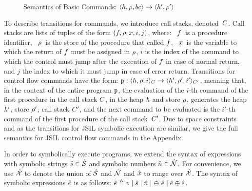 \begin{figure}[ht!]
{}
\vspace*{-0.5cm}
\caption{Semantics of \jsil Basic Commands: {$\semtrans{\heap, \store, \bcmd}{\heap', \store'}$}\label{fig:sem:basic:commands}}
\vspace*{-0.5cm}
\end{figure}

To describe transitions for \jsil commands, we introduce call stacks, denoted~$C$. Call stacks are lists of tuples of the form $(f, \rho, x, i, j)$, where: 
~$f$~is a procedure identifier, 
~$\rho$~is the store of the procedure that called $f$, ~$x$~is 
the variable to which the return of $f$ must be assigned in $\rho$,  $i$ is the index 
of the command to which the control must jump after the execution of $f$ in 
case of normal return, and  $j$ the index to which it must jump in case of 
error return. Transitions for control flow commands have the form:  $\semtrans[\prog]{\heap, \store, i}{\heap', \store', i'}[\ctx][\ctx']$, meaning that, in the context of the entire program $\mathtt{p}$, the evaluation of the $i$-th command of the first procedure in the call stack $C$, in
the heap $h$ and store $\rho$, generates the heap $h'$, store $\rho'$, call stack $C'$,   
and the next command to be evaluated is the $i'$-th command of the first procedure of the call stack~$C'$. Due to space constraints and as the transitions for JSIL symbolic execution are  similar, we give the full semantics for JSIL control flow commands in the Appendix. 

In order to symbolically execute \jsil programs, we extend the syntax of \jsil expressions with 
symbolic strings $\hat{s} \in \hat{\mathcal{S}}$ and symbolic numbers $\hat{n} \in \hat{\mathcal{N}}$. 
For convenience, we use $\hat{\mathcal{X}}$ to denote the union of $\hat{\mathcal{S}}$ and $\hat{\mathcal{N}}$ 
and $\hat{x}$ to range over $\hat{\mathcal{X}}$. 
The syntax of symbolic expressions $\hat{e}$ is as follows: $\hat{e} \triangleq v \mid \hat{s} \mid \hat{n} \mid \ominus\ \hat{e} \mid \hat{e} \oplus \hat{e}$.

